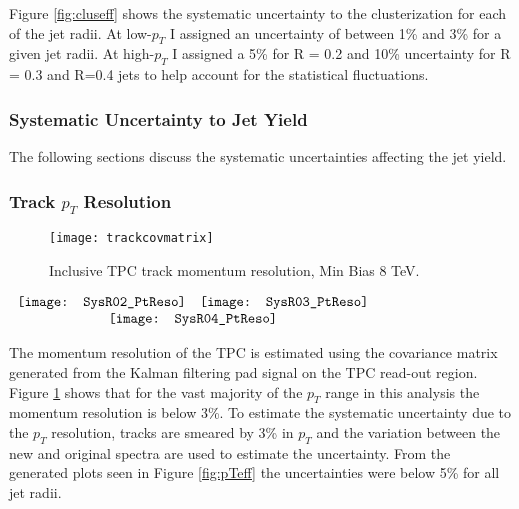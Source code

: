 Figure \ref{fig:cluseff} shows the systematic uncertainty to the clusterization for each of the jet radii.  At low-$p_{T}$ I assigned an uncertainty of between 1\% and 3\% for a given jet radii.  At high-$p_{T}$ I assigned a 5\% for R = 0.2 and 10\% uncertainty for R = 0.3 and R=0.4 jets to help account for the statistical fluctuations.

\subsubsection{Systematic Uncertainty to Jet Yield}

The following sections discuss the systematic uncertainties affecting the jet yield.

\subsubsection{Track $p_{T}$ Resolution}

\begin{figure}[h]
\texttt{[image: trackcovmatrix]}
\centering
\caption{Inclusive TPC track momentum resolution, Min Bias 8 TeV.}
\label{fig:trackpcovmatrix}
\end{figure}

\begin{figure*}[t!]
$\begin{array}{rl}
    \texttt{[image: SysR02\_PtReso]} &
    \texttt{[image: SysR03\_PtReso]}\\
    \multicolumn{2}{c}{\texttt{[image: SysR04\_PtReso]}}
\end{array}$
\caption[Systematic due to $P_{T}$ resolution.]{\label{fig:pTeff}$P_{T}$ resolution systematic; R = 0.2 \textit{(top left)}, R = 0.3 \textit{(top right)}, R = 0.4 \textit{(bottom)}.}
\end{figure*}

\noindent
The momentum resolution of the TPC is estimated using the covariance matrix generated from the Kalman filtering\cite{Fruhwirth:1987fm} pad signal on the TPC read-out region.  Figure \ref{fig:trackpcovmatrix} shows that for the vast majority of the $p_{T}$ range in this analysis the  momentum resolution is below 3\%.  To estimate the systematic uncertainty due to the $p_{T}$ resolution, tracks are smeared by 3\% in $p_{T}$ and the variation between the new and original spectra are used to estimate the uncertainty.  From the generated plots seen in Figure \ref{fig:pTeff} the uncertainties were below 5\% for all jet radii.

